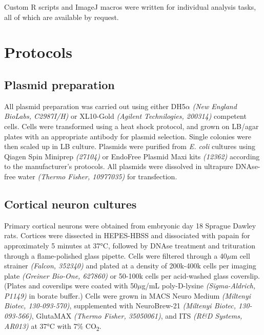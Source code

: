 \documentclass[
  12pt,
  a4paper,
]{book}
\begin{document}
Custom R scripts and ImageJ macros were written for individual analysis tasks, all of which are available by request.

\hypertarget{protocols}{%
\section{Protocols}\label{protocols}}

\hypertarget{plasmid-prep}{%
\subsection{Plasmid preparation}\label{plasmid-prep}}

All plasmid preparation was carried out using either DH5\(\alpha\) \emph{(New England BioLabs, C2987I/H)} or XL10-Gold \emph{(Agilent Technilogies, 200314)} competent cells. Cells were transformed using a heat shock protocol, and grown on LB/agar plates with an appropriate antibody for plasmid selection. Single colonies were then scaled up in LB culture. Plasmids were purified from \emph{E. coli} cultures using Qiagen Spin Miniprep \emph{(27104)} or EndoFree Plasmid Maxi kits \emph{(12362)} according to the manufacturer's protocols. All plasmids were dissolved in ultrapure DNAse-free water \emph{(Thermo Fisher, 10977035)} for transfection.

\hypertarget{cortical-neuron-cultures}{%
\subsection{Cortical neuron cultures}\label{cortical-neuron-cultures}}

Primary cortical neurons were obtained from embryonic day 18 Sprague Dawley rats. Cortices were dissected in HEPES-HBSS and dissociated with papain for approximately 5 minutes at 37°C, followed by DNAse treatment and trituration through a flame-polished glass pipette. Cells were filtered through a 40\(\mu\)m cell strainer \emph{(Falcon, 352340)} and plated at a density of 200k-400k cells per imaging plate \emph{(Greiner Bio-One, 627860)} or 50-100k cells per acid-washed glass coverslip. (Plates and coverslips were coated with 50\(\mu\)g/mL poly-D-lysine \emph{(Sigma-Aldrich, P1149)} in borate buffer.) Cells were grown in MACS Neuro Medium \emph{(Miltenyi Biotec, 130-093-570)}, supplemented with NeuroBrew-21 \emph{(Miltenyi Biotec, 130-093-566)}, GlutaMAX \emph{(Thermo Fisher, 35050061)}, and ITS \emph{(R\&D Systems, AR013)} at 37°C with 7\% CO\textsubscript{2}.
\end{document}
